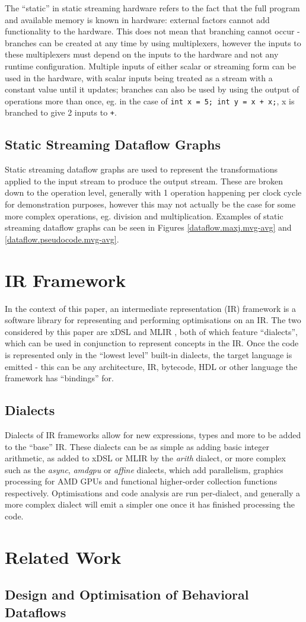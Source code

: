 \noindent
The ``static'' in static streaming hardware refers to the fact that the full program and available memory is known in hardware: external factors cannot add functionality to the hardware. This does not mean that branching cannot occur - branches can be created at any time by using multiplexers, however the inputs to these multiplexers must depend on the inputs to the hardware and not any runtime configuration. Multiple inputs of either scalar or streaming form can be used in the hardware, with scalar inputs being treated as a stream with a constant value until it updates; branches can also be used by using the output of operations more than once, eg. in the case of \lstinline|int x = 5; int y = x + x;|, x is branched to give 2 inputs to \lstinline|+|.

\subsection{Static Streaming Dataflow Graphs}
Static streaming dataflow graphs are used to represent the transformations applied to the input stream to produce the output stream. These are broken down to the operation level, generally with 1 operation happening per clock cycle for demonstration purposes, however this may not actually be the case for some more complex operations, eg. division and multiplication. Examples of static streaming dataflow graphs can be seen in Figures \ref{dataflow.maxj.mvg-avg} and \ref{dataflow.pseudocode.mvg-avg}.

\section{IR Framework}
In the context of this paper, an intermediate representation (IR) framework is a software library for representing and performing optimisations on an IR. The two considered by this paper are xDSL \cite{xdsl-home} and MLIR \cite{mlir}, both of which feature ``dialects'', which can be used in conjunction to represent concepts in the IR. Once the code is represented only in the ``lowest level'' built-in dialects, the target language is emitted - this can be any architecture, IR, bytecode, HDL or other language the framework has ``bindings'' for.

\subsection{Dialects}
Dialects of IR frameworks allow for new expressions, types and more to be added to the ``base'' IR. These dialects can be as simple as adding basic integer arithmetic, as added to xDSL or MLIR by the \textit{arith} dialect, or more complex such as the \textit{async}, \textit{amdgpu} or \textit{affine} dialects, which add parallelism, graphics processing for AMD GPUs and functional higher-order collection functions respectively. Optimisations and code analysis are run per-dialect, and generally a more complex dialect will emit a simpler one once it has finished processing the code.

\section{Related Work}
\subsection{Design and Optimisation of Behavioral Dataflows}


